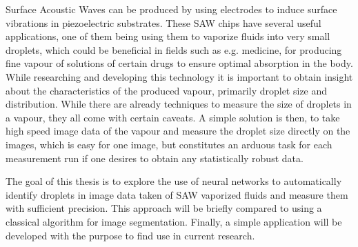 Surface Acoustic Waves can be produced by using electrodes to induce surface vibrations in piezoelectric substrates. These SAW chips have several useful applications, one of them being using them to vaporize fluids into very small droplets, which could be beneficial in fields such as e.g. medicine, for producing fine vapour of solutions of certain drugs to ensure optimal absorption in the body.
While researching and developing this technology it is important to obtain insight about the characteristics of the produced vapour, primarily droplet size and distribution. While there are already techniques to measure the size of droplets in a vapour, they all come with certain caveats. A simple solution is then, to take high speed image data of the vapour and measure the droplet size directly on the images, which is easy for one image, but constitutes an arduous task for each measurement run if one desires to obtain any statistically robust data.

The goal of this thesis is to explore the use of neural networks to automatically identify droplets in image data taken of SAW vaporized fluids and measure them with sufficient precision. This approach will be briefly compared to using a classical algorithm for image segmentation. Finally, a simple application will be developed with the purpose to find use in current research.